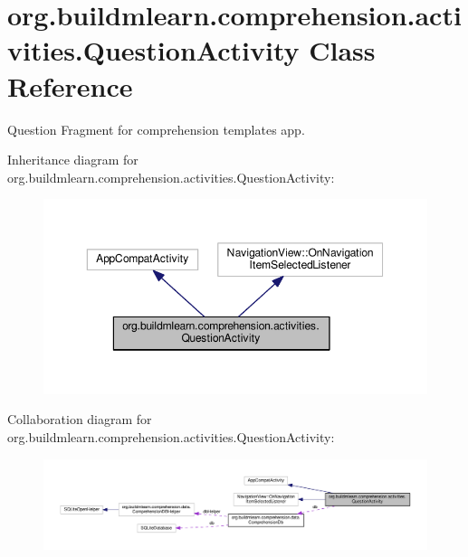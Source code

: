 \hypertarget{classorg_1_1buildmlearn_1_1comprehension_1_1activities_1_1QuestionActivity}{}\section{org.\+buildmlearn.\+comprehension.\+activities.\+Question\+Activity Class Reference}
\label{classorg_1_1buildmlearn_1_1comprehension_1_1activities_1_1QuestionActivity}


Question Fragment for comprehension template\textquotesingle{}s app.  




Inheritance diagram for org.\+buildmlearn.\+comprehension.\+activities.\+Question\+Activity\+:
\nopagebreak
\begin{figure}[H]
\begin{center}
\leavevmode
\includegraphics[width=350pt]{classorg_1_1buildmlearn_1_1comprehension_1_1activities_1_1QuestionActivity__inherit__graph}
\end{center}
\end{figure}


Collaboration diagram for org.\+buildmlearn.\+comprehension.\+activities.\+Question\+Activity\+:
\nopagebreak
\begin{figure}[H]
\begin{center}
\leavevmode
\includegraphics[width=350pt]{classorg_1_1buildmlearn_1_1comprehension_1_1activities_1_1QuestionActivity__coll__graph}
\end{center}
\end{figure}

